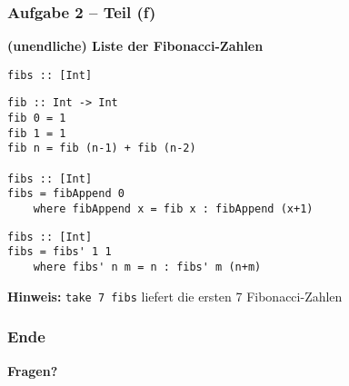 \documentclass{beamer}
\begin{document}
\begin{frame}[t, fragile] \frametitle{Aufgabe 2 -- Teil (f)}
	\small
	\textbf{(unendliche) Liste der Fibonacci-Zahlen}
	
	\texttt{fibs :: [Int]}
	
	\pause \bigskip
	\begin{lstlisting}[style=bg]
fib :: Int -> Int
fib 0 = 1
fib 1 = 1
fib n = fib (n-1) + fib (n-2)

fibs :: [Int]
fibs = fibAppend 0
	where fibAppend x = fib x : fibAppend (x+1)
	\end{lstlisting}
	\pause
	\begin{lstlisting}[style=bg]
fibs :: [Int]
fibs = fibs' 1 1
	where fibs' n m = n : fibs' m (n+m)
	\end{lstlisting}

	\textbf{Hinweis:} \texttt{take 7 fibs} liefert die ersten 7 Fibonacci-Zahlen
\end{frame}


\begin{frame} \frametitle{Ende}
	\centering
	\textbf{Fragen?}
\end{frame}
\end{document}
